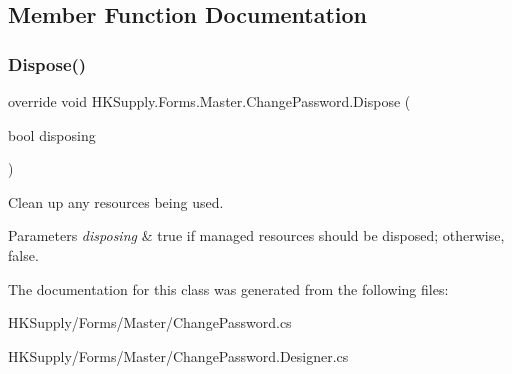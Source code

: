 \subsection{Member Function Documentation}
\mbox{\label{class_h_k_supply_1_1_forms_1_1_master_1_1_change_password_a4370e4e0a208baadce764ed1081fb017}} 
\subsubsection{\texorpdfstring{Dispose()}{Dispose()}}
{\footnotesize\ttfamily override void H\+K\+Supply.\+Forms.\+Master.\+Change\+Password.\+Dispose (\begin{DoxyParamCaption}\item[{bool}]{disposing }\end{DoxyParamCaption})\hspace{0.3cm}{\ttfamily [protected]}}



Clean up any resources being used. 


\begin{DoxyParams}{Parameters}
{\em disposing} & true if managed resources should be disposed; otherwise, false.\\
\hline
\end{DoxyParams}


The documentation for this class was generated from the following files\+:\begin{DoxyCompactItemize}
\item 
H\+K\+Supply/\+Forms/\+Master/Change\+Password.\+cs\item 
H\+K\+Supply/\+Forms/\+Master/Change\+Password.\+Designer.\+cs\end{DoxyCompactItemize}
